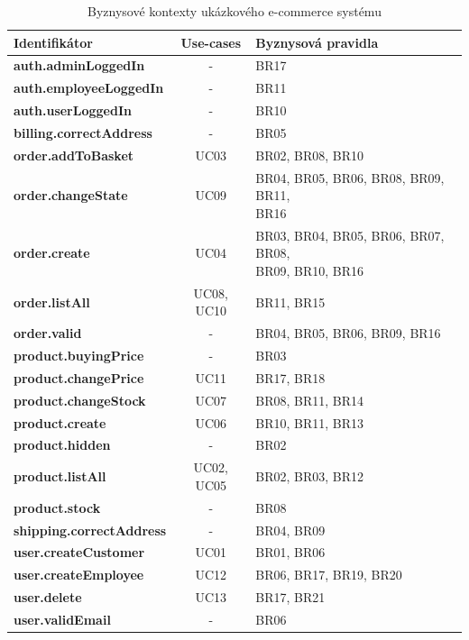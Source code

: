 \begin{table}
    \centering
    \begin{tabular*}{\textwidth}{ l c l }
        \hline
        \textbf{Identifikátor} & \textbf{Use-cases} & \textbf{Byznysová pravidla} \\ \hline \hline
        \textbf{auth.adminLoggedIn} & - & BR17 \\ \hline
        \textbf{auth.employeeLoggedIn} & - & BR11 \\ \hline
        \textbf{auth.userLoggedIn} & - & BR10 \\ \hline
        \textbf{billing.correctAddress} & - & BR05 \\ \hline
        \textbf{order.addToBasket} & UC03 & BR02, BR08, BR10 \\ \hline
        \textbf{order.changeState} & UC09 & \makecell[l]{BR04, BR05, BR06, BR08, BR09, BR11, \\ BR16} \\ \hline
        \textbf{order.create} & UC04 & \makecell[l]{BR03, BR04, BR05, BR06, BR07, BR08, \\ BR09, BR10, BR16} \\ \hline
        \textbf{order.listAll} & UC08, UC10 & BR11, BR15 \\ \hline
        \textbf{order.valid} & - & BR04, BR05, BR06, BR09, BR16 \\ \hline
        \textbf{product.buyingPrice} & - & BR03 \\ \hline
        \textbf{product.changePrice} & UC11 & BR17, BR18 \\ \hline
        \textbf{product.changeStock} & UC07 & BR08, BR11, BR14 \\ \hline
        \textbf{product.create} & UC06 & BR10, BR11, BR13 \\ \hline
        \textbf{product.hidden} & - & BR02 \\ \hline
        \textbf{product.listAll} & UC02, UC05 & BR02, BR03, BR12 \\ \hline
        \textbf{product.stock} & - & BR08 \\ \hline
        \textbf{shipping.correctAddress} & - & BR04, BR09 \\ \hline
        \textbf{user.createCustomer} & UC01 & BR01, BR06 \\ \hline
        \textbf{user.createEmployee} & UC12 & BR06, BR17, BR19, BR20 \\ \hline
        \textbf{user.delete} & UC13 & BR17, BR21 \\ \hline
        \textbf{user.validEmail} & - & BR06 \\ \hline
        \hline
    \end{tabular*}
    \caption{Byznysové kontexty ukázkového e-commerce systému}
    \label{tbl:business-contexts}
\end{table}

